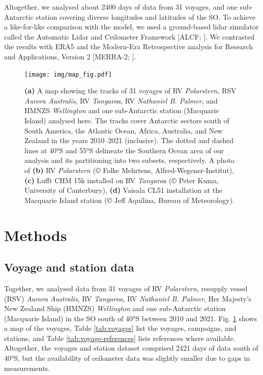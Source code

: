 \documentclass[12pt,a4paper]{article}
\begin{document}
Altogether, we analysed about 2400 days of data from 31 voyages, and one
sub-Antarctic station covering diverse longitudes and latitudes of the SO. To
achieve a like-for-like comparison with the model, we used a ground-based lidar
simulator called the Automatic Lidar and Ceilometer Framework [ALCF;
\cite{kuma2021}]. We contrasted the results with ERA5 \citep{era5} and the
Modern-Era Retrospective analysis for Research and Applications, Version 2
[MERRA-2; \cite{gelaro2017}].

\begin{figure}[b!]
\centering
\texttt{[image: img/map\_fig.pdf]}
\caption{
\textbf{(a)} A map showing the tracks of 31 voyages of RV \emph{Polarstern},
RSV \emph{Aurora Australis}, RV \emph{Tangaroa}, RV \emph{Nathaniel B. Palmer},
and HMNZS \emph{Wellington} and one sub-Antarctic station (Macquarie Island)
analysed here. The tracks cover Antarctic sectors south of South America, the
Atlantic Ocean, Africa, Australia, and New Zealand in the years 2010--2021
(inclusive).  The dotted and dashed lines at 40°S and 55°S delineate the
Southern Ocean area of our analysis and its partitioning into two subsets,
respectively.  A photo of \textbf{(b)} RV \emph{Polarstern} (© Folke Mehrtens,
Alfred-Wegener-Institut), \textbf{(c)} Lufft CHM 15k installed on RV
\emph{Tangaroa} (© Peter Kuma, University of Canterbury), \textbf{(d)} Vaisala
CL51 installation at the Macquarie Island station (© Jeff Aquilina, Bureau of
Meteorology).
}
\label{fig:map}
\end{figure}

\section{Methods}
\label{sec:methods}

\subsection{Voyage and station data}

Together, we analysed data from 31 voyages of RV \emph{Polarstern}, resupply
vessel (RSV) \emph{Aurora Australis}, RV \emph{Tangaroa}, RV \emph{Nathaniel B.
Palmer}, Her Majesty's New Zealand Ship (HMNZS) \emph{Wellington} and one
sub-Antarctic station (Macquarie Island) in the SO south of 40°S between 2010
and 2021. Fig. \ref{fig:map} shows a map of the voyages, Table
\ref{tab:voyages} list the voyages, campaigns, and stations, and Table
\ref{tab:voyage-references} lists references where available. Altogether, the
voyages and station dataset comprised 2421 days of data south of 40°S, but the
availability of ceilometer data was slightly smaller due to gaps in
measurements.
\end{document}
